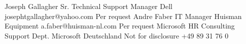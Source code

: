 %
%
%


\begin{referees}
		{Joseph Gallagher}
		{Sr. Technical Support Manager}
		{Dell}
		{josephtgallagher@yahoo.com}
		{Per request}
		{Andre Faber}
		{IT Manager}
		{Huisman Equipment}
		{a.faber@huisman-nl.com}
		{Per request}
		{Microsoft HR Consulting}
		{Support Dept.}
		{Microsoft Deutschland}
		{Not for disclosure}
		{+49 89 31 76 0}
\end{referees}